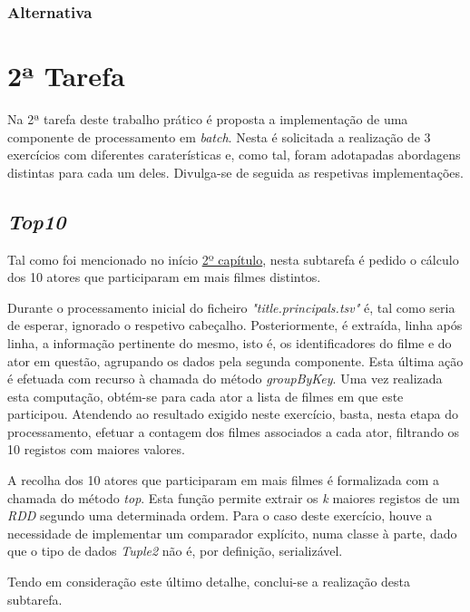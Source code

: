 \documentclass[a4paper]{report}
\begin{document}
            \subsubsection{Alternativa} \label{sssec:Task1-Trending-Alternativa}

    \section{2ª Tarefa} \label{sec:Task2}
        Na 2ª tarefa deste trabalho prático é proposta a implementação de uma componente de processamento em \textit{batch}. Nesta é solicitada a realização de 3 exercícios com diferentes caraterísticas e, como tal, foram adotapadas abordagens distintas para cada um deles.
        Divulga-se de seguida as respetivas implementações.

        \subsection{\textit{Top10}} \label{subsec:Task2-Top10}
            Tal como foi mencionado no início \hyperref[ch:Implementation]{2º capítulo}, nesta subtarefa é pedido o cálculo dos 10 atores que participaram em mais filmes distintos.

            Durante o processamento inicial do ficheiro \textsl{"title.principals.tsv"} é, tal como seria de esperar, ignorado o respetivo cabeçalho.
            Posteriormente, é extraída, linha após linha, a informação pertinente do mesmo, isto é, os identificadores do filme e do ator em questão, agrupando os dados pela segunda componente. Esta última ação é efetuada com recurso à chamada do método \textit{groupByKey}.
            Uma vez realizada esta computação, obtém-se para cada ator a lista de filmes em que este participou. Atendendo ao resultado exigido neste exercício, basta, nesta etapa do processamento, efetuar a contagem dos filmes associados a cada ator, filtrando os 10 registos com maiores valores.

            A recolha dos 10 atores que participaram em mais filmes é formalizada com a chamada do método \textit{top}. Esta função permite extrair os \textit{k} maiores registos de um \textit{RDD} segundo uma determinada ordem.
            Para o caso deste exercício, houve a necessidade de implementar um comparador explícito, numa classe à parte, dado que o tipo de dados \textit{Tuple2} não é, por definição, serializável.

            Tendo em consideração este último detalhe, conclui-se a realização desta subtarefa.
\end{document}
